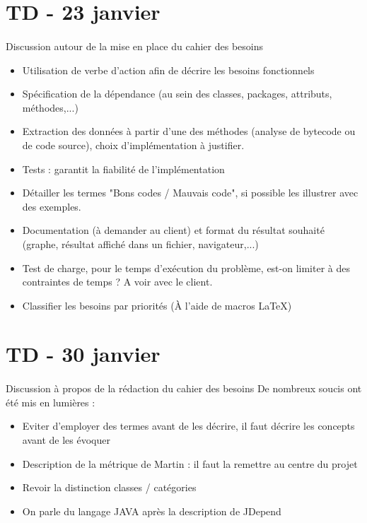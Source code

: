 \documentclass{scrartcl}
\begin{document}
\section{TD - 23 janvier}
\paragraph{}Discussion autour de la mise en place du cahier des besoins
\begin{itemize}
    \item Utilisation de verbe d'action afin de décrire les besoins fonctionnels
    \item Spécification de la dépendance (au sein des classes, packages, attributs, méthodes,...)
    \item Extraction des données à partir d'une des méthodes (analyse de bytecode ou de code source), choix d'implémentation à justifier.
    \item Tests : garantit la fiabilité de l'implémentation
    \item Détailler les termes "Bons codes / Mauvais code", si possible les illustrer avec des exemples.
    \item Documentation (à demander au client) et format du résultat souhaité (graphe, résultat affiché dans un fichier, navigateur,...)
    \item Test de charge, pour le temps d'exécution du problème, est-on limiter à des contraintes de temps ? A voir avec le client.
    \item Classifier les besoins par priorités (À l'aide de macros LaTeX) 
\end{itemize}

\section{TD - 30 janvier}
\paragraph{}Discussion à propos de la rédaction du cahier des besoins
\newline
De nombreux soucis ont été mis en lumières : 
\begin{itemize}
    \item Eviter d'employer des termes avant de les décrire, il faut décrire les concepts avant de les évoquer 
    \item Description de la métrique de Martin : il faut la remettre au centre du projet
    \item Revoir la distinction classes / catégories
    \item On parle du langage JAVA après la description de JDepend
\end{itemize}    
    
\end{document}
